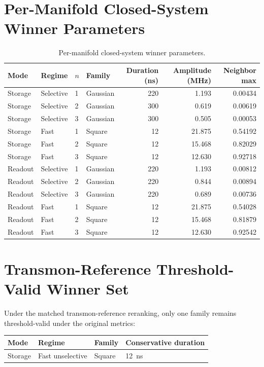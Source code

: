 \documentclass[11pt]{article}
\begin{document}
\appendix
\section{Per-Manifold Closed-System Winner Parameters}
\begin{table}[H]
  \centering
  \caption{Per-manifold closed-system winner parameters.}
  \label{tab:appendix_winners}
  \begin{tabular}{llllrrr}
    \toprule
    Mode & Regime & \(n\) & Family & Duration (ns) & Amplitude (MHz) & Neighbor max \\
    \midrule
    Storage & Selective & 1 & Gaussian & 220 & 1.193 & 0.00434 \\
    Storage & Selective & 2 & Gaussian & 300 & 0.619 & 0.00619 \\
    Storage & Selective & 3 & Gaussian & 300 & 0.505 & 0.00053 \\
    Storage & Fast & 1 & Square & 12 & 21.875 & 0.54192 \\
    Storage & Fast & 2 & Square & 12 & 15.468 & 0.82029 \\
    Storage & Fast & 3 & Square & 12 & 12.630 & 0.92718 \\
    Readout & Selective & 1 & Gaussian & 220 & 1.193 & 0.00812 \\
    Readout & Selective & 2 & Gaussian & 220 & 0.844 & 0.00894 \\
    Readout & Selective & 3 & Gaussian & 220 & 0.689 & 0.00736 \\
    Readout & Fast & 1 & Square & 12 & 21.875 & 0.54028 \\
    Readout & Fast & 2 & Square & 12 & 15.468 & 0.81879 \\
    Readout & Fast & 3 & Square & 12 & 12.630 & 0.92542 \\
    \bottomrule
  \end{tabular}
\end{table}

\section{Transmon-Reference Threshold-Valid Winner Set}
Under the matched transmon-reference reranking, only one family remains threshold-valid under the original metrics:
\begin{center}
\begin{tabular}{llll}
\toprule
Mode & Regime & Family & Conservative duration \\
\midrule
Storage & Fast unselective & Square & \SI{12}{ns} \\
\bottomrule
\end{tabular}
\end{center}
\end{document}

